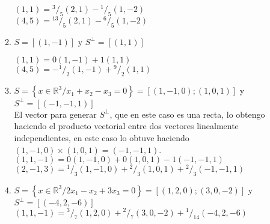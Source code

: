 \documentclass[11pt]{article}
\newcommand*\rfrac[2]{{}^{#1}\!/_{#2}} %
\begin{document}
\begin{enumerate}
\begin{enumerate}
\begin{center}
       \end{center}
       $(1,1) = \rfrac{3}{5} (2,1) - \rfrac{1}{5} (1,-2)$\\
       $(4,5) = \rfrac{13}{5} (2,1) - \rfrac{6}{5} (1,-2)$
      \item $S = [(1,-1)]$ y $S^{\perp} = [(1,1)]$
        \begin{center}
       \end{center}
       $(1,1) = 0 (1,-1) + 1 (1,1)$\\
       $(4,5) = -\rfrac{1}{2} (1,-1) + \rfrac{9}{2} (1,1)$
     \item $S=\left\{x \in \mathbb{R}^3 / x_1+x_2-x_3=0\right\} = 
       [(1,-1,0);(1,0,1)]$ y $S^{\perp} = [(-1,-1,1)]$\\
       El vector para generar $S^{\perp}$, que en este caso es una recta, lo obtengo
       haciendo el producto vectorial entre dos vectores linealmente independientes,
       en este caso lo obtuve haciendo $(1,-1,0) \times (1,0,1) = (-1,-1,1)$.\\
       $(1, 1, -1)= 0 (1,-1,0) + 0 (1,0,1) -1 (-1,-1,1) $\\
       $(2, -1, 3)= \rfrac{1}{3}(1,-1,0)+\rfrac{2}{3}(1,0,1)+\rfrac{2}{3}(-1,-1,1) $\\
     \item $S=\left\{x \in \mathbb{R}^3 / 2 x_1-x_2+3x_3=0\right\} = 
       [(1,2,0);(3,0,-2)]$ y $S^{\perp} = [(-4,2,-6)]$\\
       $ (1, 1, -1) = \rfrac{3}{7}(1,2,0) +\rfrac{2}{7}(3,0,-2) +\rfrac{1}{14}(-4,2,-6)$

\end{enumerate}
\end{enumerate}
\end{document}
